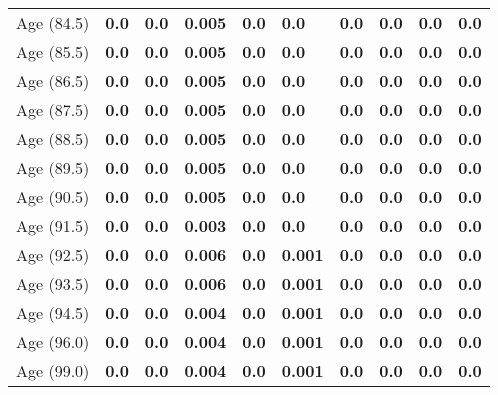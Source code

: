 \begin{tabular}{llllllllll}
Age (84.5) & \textbf{0.0} & \textbf{0.0} & \textbf{0.005} & \textbf{0.0} & \textbf{0.0} & \textbf{0.0} & \textbf{0.0} & \textbf{0.0} & \textbf{0.0} \\
Age (85.5) & \textbf{0.0} & \textbf{0.0} & \textbf{0.005} & \textbf{0.0} & \textbf{0.0} & \textbf{0.0} & \textbf{0.0} & \textbf{0.0} & \textbf{0.0} \\
Age (86.5) & \textbf{0.0} & \textbf{0.0} & \textbf{0.005} & \textbf{0.0} & \textbf{0.0} & \textbf{0.0} & \textbf{0.0} & \textbf{0.0} & \textbf{0.0} \\
Age (87.5) & \textbf{0.0} & \textbf{0.0} & \textbf{0.005} & \textbf{0.0} & \textbf{0.0} & \textbf{0.0} & \textbf{0.0} & \textbf{0.0} & \textbf{0.0} \\
Age (88.5) & \textbf{0.0} & \textbf{0.0} & \textbf{0.005} & \textbf{0.0} & \textbf{0.0} & \textbf{0.0} & \textbf{0.0} & \textbf{0.0} & \textbf{0.0} \\
Age (89.5) & \textbf{0.0} & \textbf{0.0} & \textbf{0.005} & \textbf{0.0} & \textbf{0.0} & \textbf{0.0} & \textbf{0.0} & \textbf{0.0} & \textbf{0.0} \\
Age (90.5) & \textbf{0.0} & \textbf{0.0} & \textbf{0.005} & \textbf{0.0} & \textbf{0.0} & \textbf{0.0} & \textbf{0.0} & \textbf{0.0} & \textbf{0.0} \\
Age (91.5) & \textbf{0.0} & \textbf{0.0} & \textbf{0.003} & \textbf{0.0} & \textbf{0.0} & \textbf{0.0} & \textbf{0.0} & \textbf{0.0} & \textbf{0.0} \\
Age (92.5) & \textbf{0.0} & \textbf{0.0} & \textbf{0.006} & \textbf{0.0} & \textbf{0.001} & \textbf{0.0} & \textbf{0.0} & \textbf{0.0} & \textbf{0.0} \\
Age (93.5) & \textbf{0.0} & \textbf{0.0} & \textbf{0.006} & \textbf{0.0} & \textbf{0.001} & \textbf{0.0} & \textbf{0.0} & \textbf{0.0} & \textbf{0.0} \\
Age (94.5) & \textbf{0.0} & \textbf{0.0} & \textbf{0.004} & \textbf{0.0} & \textbf{0.001} & \textbf{0.0} & \textbf{0.0} & \textbf{0.0} & \textbf{0.0} \\
Age (96.0) & \textbf{0.0} & \textbf{0.0} & \textbf{0.004} & \textbf{0.0} & \textbf{0.001} & \textbf{0.0} & \textbf{0.0} & \textbf{0.0} & \textbf{0.0} \\
Age (99.0) & \textbf{0.0} & \textbf{0.0} & \textbf{0.004} & \textbf{0.0} & \textbf{0.001} & \textbf{0.0} & \textbf{0.0} & \textbf{0.0} & \textbf{0.0} \\
\bottomrule
\end{tabular}
